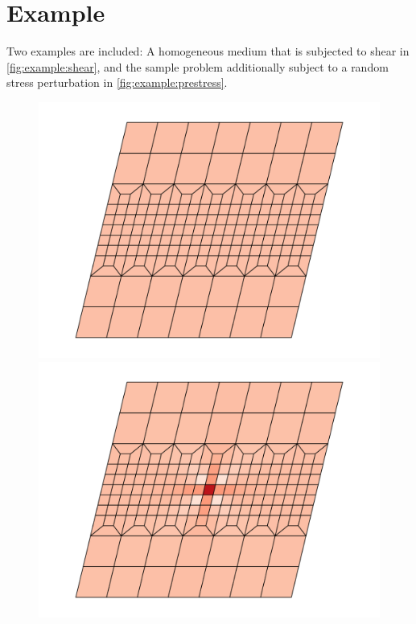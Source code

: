 \documentclass[fleqn]{goose-article}
\begin{document}
\clearpage

\section*{Example}

Two examples are included:
A homogeneous medium that is subjected to shear in \cref{fig:example:shear}, and
the sample problem additionally subject to a random stress perturbation
in \cref{fig:example:prestress}.

\begin{figure}[htp]
    \centering
    \captionsetup[subfigure]{justification=centering}
    \begin{minipage}[t]{.40\textwidth}
        \centering
        \includegraphics[width=\textwidth]{example_shear_config.pdf}
    \end{minipage}
    \hspace{0.01\textwidth}
    \begin{minipage}[t]{.40\textwidth}
        \centering
        \includegraphics[width=\textwidth]{example_shear_config-perturbed.pdf}

\end{minipage}
\end{figure}
\end{document}
